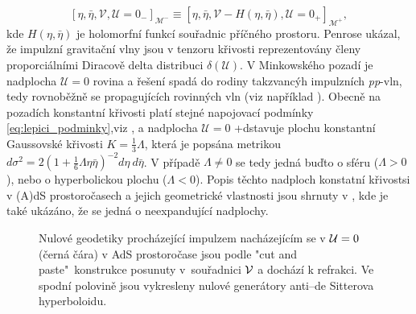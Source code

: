 \begin{equation}
    \label{eq:lepici_podminky}
\left[\eta, \bar{\eta}, \mathcal{V}, \mathcal{U}=0_- \right]_{\mathcal{M}^-} \equiv 
\left[\eta, \bar{\eta}, \mathcal{V}-H\left(\eta, \bar{\eta}\right), \mathcal{U}=0_+  \right]_{\mathcal{M}^+},
\end{equation}
kde $H(\eta, \bar{\eta})$ je holomorfní funkcí souřadnic příčného prostoru. Penrose \cite{Penrose:1972xrn} ukázal, že impulzní gravitační vlny
jsou v tenzoru křivosti reprezentovány členy proporciálními Diracově delta distribuci $\delta(\mathcal{U})$.
V Minkowského pozadí je nadplocha $\mathcal{U}=0$ rovina a řešení spadá do rodiny takzvancýh impulzních \emph{pp}-vln, tedy
rovnoběžně se propagujících rovinných vln (viz například \cite{griffiths_podolsky_2009}). Obecně na pozadích konstantní křivosti platí stejné napojovací podmínky
\eqref{eq:lepici_podminky},viz \cite{Podolsky:2014ysa}, a nadplocha $\mathcal{U}=0$ +dstavuje plochu konstantní Gaussovské křivosti 
$K=\frac{1}{3}\Lambda$, která je popsána metrikou $d\sigma^2=2(1+\frac{1}{6}\Lambda \eta \bar{\eta})^{-2} 
d\eta~d\bar{\eta}$. V případě $\Lambda \neq 0$ se tedy jedná buďto o sféru
($\Lambda > 0$), nebo o hyperbolickou plochu ($\Lambda < 0$). Popis těchto nadploch konstatní křivostsi v (A)dS prostoročasech a
jejich geometrické vlastnosti jsou shrnuty v \cite{Podolsky:1997ri}, kde je také ukázáno,
že se jedná o neexpandující nadplochy.

\begin{figure}[H]
    \centering
    \caption{Nulové geodetiky procházející impulzem nacházejícím se v $\mathcal{U}=0$ (černá čára) v AdS prostoročase jsou podle "cut and paste"\ konstrukce posunuty
    v~souřadnici $\mathcal{V}$ a dochází k refrakci. Ve spodní polovině jsou vykresleny nulové generátory anti--de Sitterova hyperboloidu.}
\end{figure}

